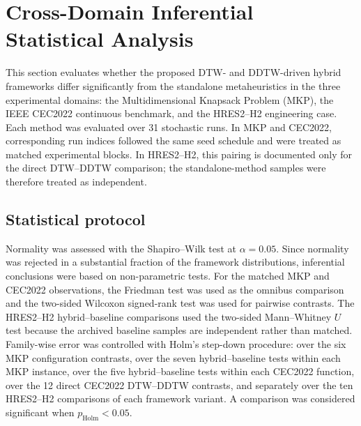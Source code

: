 %

\section{Cross-Domain Inferential Statistical Analysis}
\label{sec:statistical-analysis-final}

This section evaluates whether the proposed DTW- and DDTW-driven hybrid
frameworks differ significantly from the standalone metaheuristics in the
three experimental domains: the Multidimensional Knapsack Problem (MKP), the
IEEE CEC2022 continuous benchmark, and the HRES2--H2 engineering case. Each
method was evaluated over 31 stochastic runs. In MKP and CEC2022, corresponding
run indices followed the same seed schedule and were treated as matched
experimental blocks. In HRES2--H2, this pairing is documented only for the
direct DTW--DDTW comparison; the standalone-method samples were therefore
treated as independent.

\subsection{Statistical protocol}

Normality was assessed with the Shapiro--Wilk test at $\alpha=0.05$. Since
normality was rejected in a substantial fraction of the framework
distributions, inferential conclusions were based on non-parametric tests. For
the matched MKP and CEC2022 observations, the Friedman test was used as the
omnibus comparison and the two-sided Wilcoxon signed-rank test was used for
pairwise contrasts. The HRES2--H2 hybrid--baseline comparisons used the
two-sided Mann--Whitney $U$ test because the archived baseline samples are
independent rather than matched. Family-wise error was controlled with Holm's
step-down procedure: over the six MKP configuration contrasts, over the seven
hybrid--baseline tests within each MKP instance, over the five
hybrid--baseline tests within each CEC2022 function, over the 12 direct
CEC2022 DTW--DDTW contrasts, and separately over the ten HRES2--H2 comparisons
of each framework variant. A comparison was considered significant when
$p_{\mathrm{Holm}}<0.05$.

